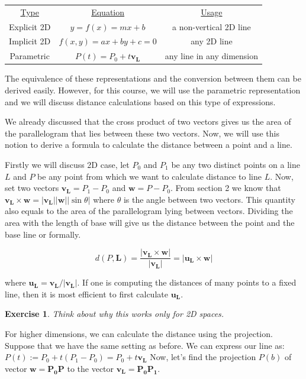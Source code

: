 \documentclass[12pt]{article}
\newtheorem{exercise}{Exercise}[section]
\begin{document}
\begin{center}
  \begin{tabular}{ c c c }
   \underline{Type} & \underline{Equation} & \underline{Usage} \\
   Explicit 2D & $y=f(x)=mx+b$ & a non-vertical 2D line \\ 
   Implicit 2D & $f(x,y)=ax+by+c=0$ & any 2D line \\  
   Parametric & $P(t) = P_0+t\pmb{v_L}$ & any line in any dimension    
  \end{tabular}
\end{center}

The equivalence of these representations and the conversion between them can be derived easily.
However, for this course, we will use the parametric representation and we will discuss
distance calculations based on this type of expressions.

We already discussed that the cross product of two vectors gives us the area of the
parallelogram that lies between these two vectors. Now, we will use this notion
to derive a formula to calculate the distance between a point and a line.

Firstly we will discuss 2D case, let $P_0$ and $P_1$ be any two distinct points on a line $L$ and $P$ be any point
from which we want to calculate distance to line $L$. Now, set two vectors
$\pmb{v_L} = P_1-P_0$ and $\pmb{w}=P-P_0$. From section 2 we know that 
$\pmb{v_L} \times \pmb{w} = |\pmb{v_L}||\pmb{w}||\sin \theta|$ where 
$\theta$ is the angle between two vectors. This quantity also equals to the area of
the parallelogram lying between vectors. Dividing the area with the length of base will give us the distance between the point and the base line or formally.

$$ d(P,\pmb{L}) = \frac{|\pmb{v_L} \times \pmb{w}|}{|\pmb{v_L}|} = 
|\pmb{u_L} \times \pmb{w}| $$

where $\pmb{u_L} = \pmb{v_L}/|\pmb{v_L}|$. If one is computing the distances of many points to a 
fixed line, then it is most efficient to first calculate $\pmb{u_L}$.

\begin{exercise}
  Think about why this works only for 2D spaces.
\end{exercise}

For higher dimensions, we can calculate the distance using the projection. Suppose 
that we have the same setting as before. We can express our line as: 
$P(t):=P_0 + t(P_1-P_0)=P_0+t\pmb{v_L}$
Now, let's find the projection $P(b)$ of vector $\pmb{w} = \pmb{P_0P}$ 
to the vector $\pmb{v_L} = \pmb{P_0P_1}$.
\end{document}
